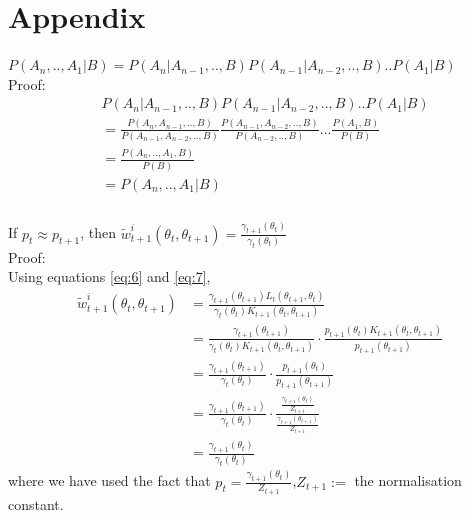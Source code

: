 \documentclass[12pt]{article}
\theoremstyle{definition}
\begin{document}
\section{Appendix}
$P(A_{n},..,A_{1}|B) = P(A_{n}|A_{n-1},..,B)P(A_{n-1}|A_{n-2},..,B)..P(A_{1}|B)$\\
Proof:
\begin{equation*}
\begin{split}
&P(A_{n}|A_{n-1},..,B)P(A_{n-1}|A_{n-2},..,B)..P(A_{1}|B)\\
 &= \frac{P(A_{n},A_{n-1},..,B)}{P(A_{n-1},A_{n-2},..,B)}\frac{P(A_{n-1},A_{n-2},..,B)}{P(A_{n-2},..,B)}...\frac{P(A_{1},B)}{P(B)}\\
 &= \frac{P(A_{n},..,A_{1},B)}{P(B)}\\
 &= P(A_{n},..,A_{1}|B)\\
 \end{split}
\end{equation*}\\
\bigskip
If $p_{t} \approx p_{t+1}$, then $\widetilde{w}_{t+1}^{i}(\theta_{t},\theta_{t+1}) = \frac{\gamma_{t+1}(\theta_{t})}{\gamma_{t}(\theta_{t})}$ \\
Proof:\\
Using equations \ref{eq:6} and \ref{eq:7},\\
\begin{equation*}
\begin{split}
\widetilde{w}_{t+1}^{i}(\theta_{t},\theta_{t+1}) &= \frac{\gamma_{t+1}(\theta_{t+1})L_{t}(\theta_{t+1},\theta_{t})}{\gamma_{t}(\theta_{t})K_{t+1}(\theta_{t},\theta_{t+1})}\\
&= \frac{\gamma_{t+1}(\theta_{t+1})}{\gamma_{t}(\theta_{t})K_{t+1}(\theta_{t},\theta_{t+1})}\cdot \frac{p_{t+1}(\theta_{t})K_{t+1}(\theta_{t},\theta_{t+1})}{p_{t+1}(\theta_{t+1})}\\
&= \frac{\gamma_{t+1}(\theta_{t+1})}{\gamma_{t}(\theta_{t})}\cdot \frac{p_{t+1}(\theta_{t})}{p_{t+1}(\theta_{t+1})}\\
&= \frac{\gamma_{t+1}(\theta_{t+1})}{\gamma_{t}(\theta_{t})}\cdot \frac{\frac{\gamma_{t+1}(\theta_{t})}{Z_{t+1}}}{\frac{\gamma_{t+1}(\theta_{t+1})}{Z_{t+1}}}\\
&= \frac{\gamma_{t+1}(\theta_{t})}{\gamma_{t}(\theta_{t})}
\end{split}
\end{equation*}
where we have used the fact that $p_{t} = \frac{\gamma_{t+1}(\theta_{t})}{Z_{t+1}}$,$Z_{t+1}:=$ the normalisation constant.\\



\end{document}
